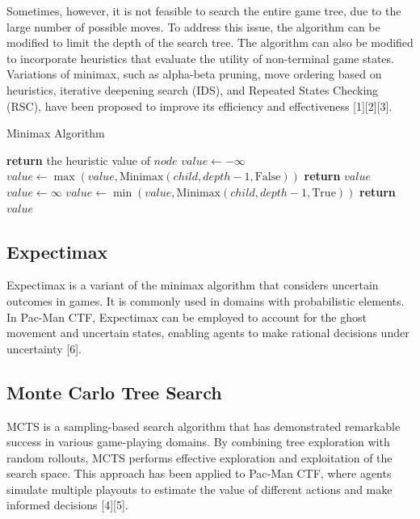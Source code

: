 \documentclass[a4paper,12pt]{article}
\begin{document}
Sometimes, however, it is not feasible to search the entire game tree, due to the large number of possible moves. To address this issue, the algorithm can be modified to limit the depth of the search tree. The algorithm can also be modified to incorporate heuristics that evaluate the utility of non-terminal game states. Variations of minimax, such as alpha-beta pruning, move ordering based on heuristics, iterative deepening search (IDS), and Repeated States Checking (RSC), have been proposed to improve its efficiency and effectiveness [1][2][3].

\begin{algorithm}
\caption{Minimax Algorithm}
\label{alg:minimax}
\begin{algorithmic}[1]
\State \textbf{return} the heuristic value of $node$
\EndIf
{}
\State $value \gets -\infty$
\State $value \gets \max(value, \text{Minimax}(child, depth-1, \text{False}))$
\EndFor
\State \textbf{return} $value$
\Else
\State $value \gets \infty$
\State $value \gets \min(value, \text{Minimax}(child, depth-1, \text{True}))$
\EndFor
\State \textbf{return} $value$
\EndIf
\EndProcedure
\end{algorithmic}
\end{algorithm}

\subsection{Expectimax}
\label{subsec:expectimax}
Expectimax is a variant of the minimax algorithm that considers uncertain outcomes in games. It is commonly used in domains with probabilistic elements. In Pac-Man CTF, Expectimax can be employed to account for the ghost movement and uncertain states, enabling agents to make rational decisions under uncertainty [6].

\subsection{Monte Carlo Tree Search}
\label{subsec:mcts}
MCTS is a sampling-based search algorithm that has demonstrated remarkable success in various game-playing domains. By combining tree exploration with random rollouts, MCTS performs effective exploration and exploitation of the search space. This approach has been applied to Pac-Man CTF, where agents simulate multiple playouts to estimate the value of different actions and make informed decisions [4][5].
\end{document}
